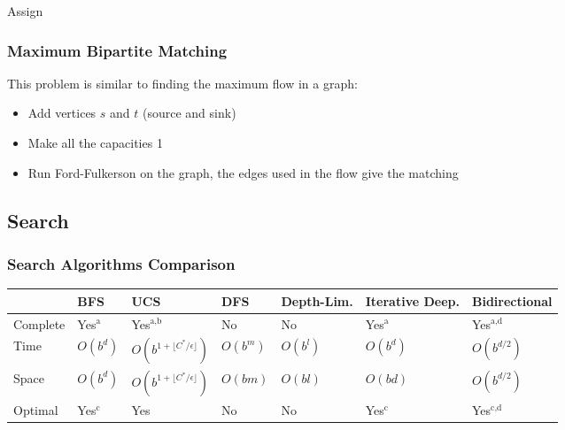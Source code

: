 \documentclass[a4paper, 12pt]{article}
\begin{document}
\IncMargin{2em}
\begin{algorithm}[H]
\caption{Assign}
\vspace{0.1cm}
\Indm
{}
\Indp
\vspace{0.1cm}
\end{algorithm}
\DecMargin{2em}

    \subsubsection{Maximum Bipartite Matching}

This problem is similar to finding the maximum flow in a graph:
\begin{itemize}
  \item Add vertices $s$ and $t$ (source and sink)
	\item Make all the capacities 1
	\item Run Ford-Fulkerson on the graph, the edges used in the flow give the matching
\end{itemize}

  \subsection{Search}

    \subsubsection{Search Algorithms Comparison}

\begin{tabular}{|l|l|l|l|l|l|l|}
  \cline{2-7}
  \multicolumn{1}{c|}{} & BFS & UCS & DFS & Depth-Lim. & Iterative Deep. & Bidirectional\\ \hline
  Complete & Yes$^\text{a}$ & Yes$^\text{a,b}$ & No & No & Yes$^\text{a}$ & Yes$^\text{a,d}$\\ \hline
  Time & $O(b^d)$ & $O(b^{1+\lfloor C^*/\epsilon\rfloor})$ & $O(b^m)$ & $O(b^l)$ & $O(b^d)$ & $O(b^{d/2})$\\ \hline
  Space & $O(b^d)$ & $O(b^{1+\lfloor C^*/\epsilon\rfloor})$ & $O(bm)$ & $O(bl)$ & $O(bd)$ & $O(b^{d/2})$\\ \hline
  Optimal & Yes$^\text{c}$ & Yes & No & No & Yes$^\text{c}$ & Yes$^\text{c,d}$\\ \hline
\end{tabular}
\end{document}
